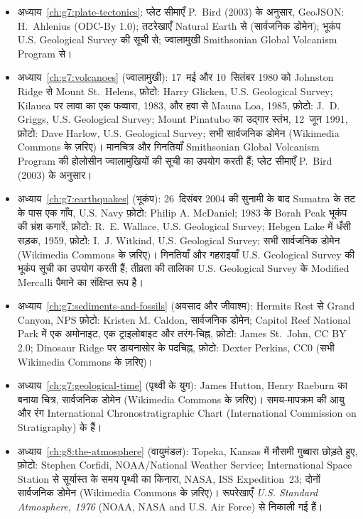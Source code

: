 \begin{itemize}
  \item अध्याय~\ref{ch:g7:plate-tectonics}: प्लेट सीमाएँ P.~Bird (2003) के अनुसार, GeoJSON: H.~Ahlenius (ODC-By 1.0); तटरेखाएँ Natural Earth से (सार्वजनिक डोमेन); भूकंप U.S. Geological Survey की सूची से; ज्वालामुखी Smithsonian Global Volcanism Program से।
  \item अध्याय~\ref{ch:g7:volcanoes} (ज्वालामुखी): 17~मई और 10~सितंबर 1980 को Johnston Ridge से Mount St.~Helens, फ़ोटो: Harry Glicken, U.S. Geological Survey; Kilauea पर लावा का एक फव्वारा, 1983, और हवा से Mauna Loa, 1985, फ़ोटो: J.~D. Griggs, U.S. Geological Survey; Mount Pinatubo का उद्गार स्तंभ, 12~जून 1991, फ़ोटो: Dave Harlow, U.S. Geological Survey; सभी सार्वजनिक डोमेन (Wikimedia Commons के ज़रिए)। मानचित्र और गिनतियाँ Smithsonian Global Volcanism Program की होलोसीन ज्वालामुखियों की सूची का उपयोग करती हैं; प्लेट सीमाएँ P.~Bird (2003) के अनुसार।
  \item अध्याय~\ref{ch:g7:earthquakes} (भूकंप): 26~दिसंबर 2004 की सुनामी के बाद Sumatra के तट के पास एक गाँव, U.S. Navy फ़ोटो: Philip A. McDaniel; 1983 के Borah Peak भूकंप की भ्रंश कगारें, फ़ोटो: R.~E. Wallace, U.S. Geological Survey; Hebgen Lake में धँसी सड़क, 1959, फ़ोटो: I.~J. Witkind, U.S. Geological Survey; सभी सार्वजनिक डोमेन (Wikimedia Commons के ज़रिए)। गिनतियाँ और गहराइयाँ U.S. Geological Survey की भूकंप सूची का उपयोग करती हैं; तीव्रता की तालिका U.S. Geological Survey के Modified Mercalli पैमाने का संक्षिप्त रूप है।
  \item अध्याय~\ref{ch:g7:sediments-and-fossils} (अवसाद और जीवाश्म): Hermits Rest से Grand Canyon, NPS फ़ोटो: Kristen M. Caldon, सार्वजनिक डोमेन; Capitol Reef National Park में एक अमोनाइट, एक ट्राइलोबाइट और तरंग-चिह्न, फ़ोटो: James St.~John, CC BY 2.0; Dinosaur Ridge पर डायनासोर के पदचिह्न, फ़ोटो: Dexter Perkins, CC0 (सभी Wikimedia Commons के ज़रिए)।
  \item अध्याय~\ref{ch:g7:geological-time} (पृथ्वी के युग): James Hutton, Henry Raeburn का बनाया चित्र, सार्वजनिक डोमेन (Wikimedia Commons के ज़रिए)। समय-मापक्रम की आयु और रंग International Chronostratigraphic Chart (International Commission on Stratigraphy) के हैं।
  \item अध्याय~\ref{ch:g8:the-atmosphere} (वायुमंडल): Topeka, Kansas में मौसमी गुब्बारा छोड़ते हुए, फ़ोटो: Stephen Corfidi, NOAA/National Weather Service; International Space Station से सूर्यास्त के समय पृथ्वी का किनारा, NASA, ISS Expedition~23; दोनों सार्वजनिक डोमेन (Wikimedia Commons के ज़रिए)। रूपरेखाएँ \emph{U.S. Standard Atmosphere, 1976} (NOAA, NASA and U.S. Air Force) से निकाली गई हैं।

\end{itemize}

